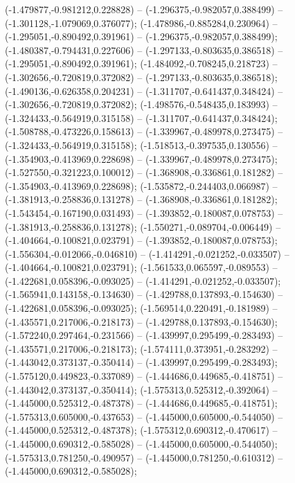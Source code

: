  (-1.479877,-0.981212,0.228828) -- (-1.296375,-0.982057,0.388499) -- (-1.301128,-1.079069,0.376077);
 (-1.478986,-0.885284,0.230964) -- (-1.295051,-0.890492,0.391961) -- (-1.296375,-0.982057,0.388499);
 (-1.480387,-0.794431,0.227606) -- (-1.297133,-0.803635,0.386518) -- (-1.295051,-0.890492,0.391961);
 (-1.484092,-0.708245,0.218723) -- (-1.302656,-0.720819,0.372082) -- (-1.297133,-0.803635,0.386518);
 (-1.490136,-0.626358,0.204231) -- (-1.311707,-0.641437,0.348424) -- (-1.302656,-0.720819,0.372082);
 (-1.498576,-0.548435,0.183993) -- (-1.324433,-0.564919,0.315158) -- (-1.311707,-0.641437,0.348424);
 (-1.508788,-0.473226,0.158613) -- (-1.339967,-0.489978,0.273475) -- (-1.324433,-0.564919,0.315158);
 (-1.518513,-0.397535,0.130556) -- (-1.354903,-0.413969,0.228698) -- (-1.339967,-0.489978,0.273475);
 (-1.527550,-0.321223,0.100012) -- (-1.368908,-0.336861,0.181282) -- (-1.354903,-0.413969,0.228698);
 (-1.535872,-0.244403,0.066987) -- (-1.381913,-0.258836,0.131278) -- (-1.368908,-0.336861,0.181282);
 (-1.543454,-0.167190,0.031493) -- (-1.393852,-0.180087,0.078753) -- (-1.381913,-0.258836,0.131278);
 (-1.550271,-0.089704,-0.006449) -- (-1.404664,-0.100821,0.023791) -- (-1.393852,-0.180087,0.078753);
 (-1.556304,-0.012066,-0.046810) -- (-1.414291,-0.021252,-0.033507) -- (-1.404664,-0.100821,0.023791);
 (-1.561533,0.065597,-0.089553) -- (-1.422681,0.058396,-0.093025) -- (-1.414291,-0.021252,-0.033507);
 (-1.565941,0.143158,-0.134630) -- (-1.429788,0.137893,-0.154630) -- (-1.422681,0.058396,-0.093025);
 (-1.569514,0.220491,-0.181989) -- (-1.435571,0.217006,-0.218173) -- (-1.429788,0.137893,-0.154630);
 (-1.572240,0.297464,-0.231566) -- (-1.439997,0.295499,-0.283493) -- (-1.435571,0.217006,-0.218173);
 (-1.574111,0.373951,-0.283292) -- (-1.443042,0.373137,-0.350414) -- (-1.439997,0.295499,-0.283493);
 (-1.575120,0.449823,-0.337089) -- (-1.444686,0.449685,-0.418751) -- (-1.443042,0.373137,-0.350414);
 (-1.575313,0.525312,-0.392064) -- (-1.445000,0.525312,-0.487378) -- (-1.444686,0.449685,-0.418751);
 (-1.575313,0.605000,-0.437653) -- (-1.445000,0.605000,-0.544050) -- (-1.445000,0.525312,-0.487378);
 (-1.575312,0.690312,-0.470617) -- (-1.445000,0.690312,-0.585028) -- (-1.445000,0.605000,-0.544050);
 (-1.575313,0.781250,-0.490957) -- (-1.445000,0.781250,-0.610312) -- (-1.445000,0.690312,-0.585028);
